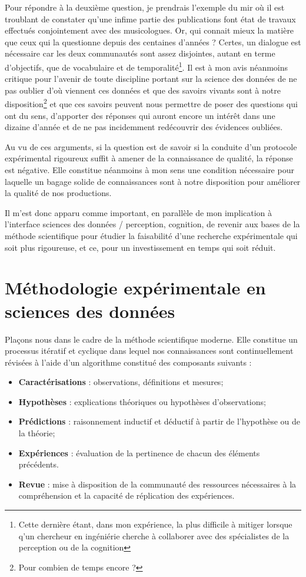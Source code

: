 Pour répondre à la deuxième question, je prendrais l'exemple du mir où il est troublant de constater qu'une infime partie des publications font état de travaux effectués conjointement avec des musicologues. Or, qui connait mieux la matière que ceux qui la questionne depuis des centaines d'années ? Certes, un dialogue est nécessaire car les deux communautés sont assez disjointes, autant en terme d'objectifs, que de vocabulaire et de temporalité\footnote{Cette dernière étant, dans mon expérience, la plus difficile à mitiger lorsque q'un chercheur en ingéniérie cherche à collaborer avec des spécialistes de la perception ou de la cognition}. Il est à mon avis néanmoins critique pour l'avenir de toute discipline portant sur la science des données de ne pas oublier d'où viennent ces données et que des savoirs vivants sont à notre disposition\footnote{Pour combien de temps encore ?} et que ces savoirs peuvent nous permettre de poser des questions qui ont du sens, d'apporter des réponses qui auront encore un intérêt dans une dizaine d'année et de ne pas incidemment redécouvrir des évidences oubliées.

Au vu de ces arguments, si la question est de savoir si la conduite d'un protocole expérimental rigoureux suffit à amener de la connaissance de qualité, la réponse est négative. Elle constitue néanmoins à mon sens une condition nécessaire pour laquelle un bagage solide de connaissances sont à notre disposition pour améliorer la qualité de nos productions.

Il m'est donc apparu comme important, en parallèle de mon implication à l'interface sciences des données / perception, cognition, de revenir aux bases de la méthode scientifique pour étudier la faisabilité d'une recherche expérimentale qui soit plus rigoureuse, et ce, pour un investissement en temps qui soit réduit.

\section{ \nmu Méthodologie expérimentale en sciences des données} \label{sec:xp}

Plaçons nous dans le cadre de la méthode scientifique moderne. Elle constitue un processus itératif et cyclique dans lequel nos connaissances sont continuellement révisées à l'aide d'un algorithme constitué des composants suivants :
\begin{itemize}
  \item \textbf{Caractérisations} : observations, définitions et mesures;
  \item \textbf{Hypothèses} : explications théoriques ou hypothèses d'observations;
  \item \textbf{Prédictions} : raisonnement inductif et déductif à partir de l'hypothèse ou de la théorie;
  \item \textbf{Expériences} : évaluation de la pertinence de chacun des éléments précédents.
  \item \textbf{Revue} : mise à disposition  de la communauté des ressources nécessaires à la compréhension et la capacité de réplication des expériences.
\end{itemize}

